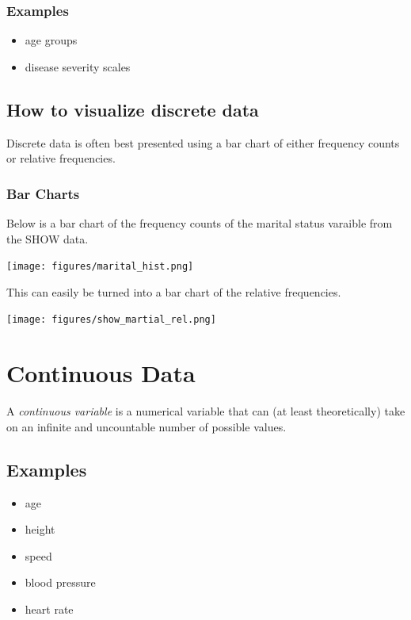 \documentclass[]{book}
\providecommand{\tightlist}{%
  \setlength{\itemsep}{0pt}\setlength{\parskip}{0pt}}
\theoremstyle{definition}
\theoremstyle{definition}
\theoremstyle{definition}
\theoremstyle{remark}
\begin{document}
\hypertarget{examples-1}{%
\subsection{Examples}\label{examples-1}}

\begin{itemize}
\tightlist
\item
  age groups
\item
  disease severity scales
\end{itemize}

\hypertarget{how-to-visualize-discrete-data}{%
\section{How to visualize discrete data}\label{how-to-visualize-discrete-data}}

Discrete data is often best presented using a bar chart of either frequency counts or relative frequencies.

\hypertarget{bar-charts}{%
\subsection{Bar Charts}\label{bar-charts}}

Below is a bar chart of the frequency counts of the marital status varaible from the SHOW data.

\texttt{[image: figures/marital\_hist.png]}

This can easily be turned into a bar chart of the relative frequencies.

\texttt{[image: figures/show\_martial\_rel.png]}

\hypertarget{continuous}{%
\chapter{Continuous Data}\label{continuous}}

A \emph{continuous variable} is a numerical variable that can (at least theoretically) take on an infinite and uncountable number of possible values.

\hypertarget{examples-2}{%
\section{Examples}\label{examples-2}}

\begin{itemize}
\tightlist
\item
  age
\item
  height
\item
  speed
\item
  blood pressure
\item
  heart rate
\end{itemize}
\end{document}

